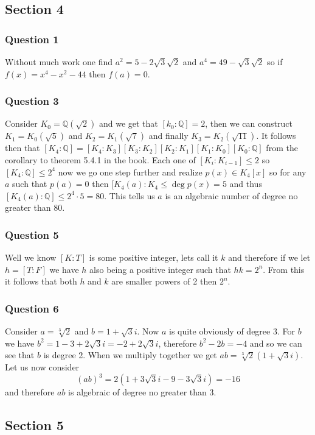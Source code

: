 \documentclass{article}
\begin{document}
\subsection{Section 4}
\subsubsection{Question 1}
Without much work one find $a^2 = 5-2\sqrt3\sqrt2$ and $a^4=49-\sqrt3\sqrt2$ so if $f(x) = x^4-x^2-44$ then $f(a) = 0$.

\subsubsection{Question 3}
Consider $K_0 = \mathbb Q(\sqrt 2)$ and we get that $[k_0:\mathbb Q] = 2$, then we can construct $K_1 = K_0(\sqrt 5)$ and $K_2 = K_1(\sqrt 7)$ and finally $K_3=K_2(\sqrt{11})$. It follows then that $[K_4:\mathbb Q] = [K_4:K_3][K_3:K_2][K_2:K_1][K_1:K_0][K_0:\mathbb Q]$ from the corollary to theorem 5.4.1 in the book. Each one of $[K_i:K_{i-1}]\le 2$ so $[K_4:\mathbb Q] \le 2^4$ now we go one step further and realize $p(x) \in K_4[x]$ so for any $a$ such that $p(a) = 0$ then $[K_4(a):K_4 \le \deg p(x) = 5$ and thus $[K_4(a):\mathbb Q] \le 2^4\cdot5=80$. This tells us $a$ is an algebraic number of degree no greater than 80.

\subsubsection{Question 5}
Well we know $[K:T]$ is some positive integer, lets call it $k$ and therefore if we let $h = [T:F]$ we have $h$ also being a positive integer such that $hk = 2^n$. From this it follows that both $h$ and $k$ are smaller powers of 2 then $2^n$.

\subsubsection{Question 6}

Consider $a = \sqrt[3]{2}$ and $b = 1+\sqrt3i$. Now $a$ is quite obviously of degree 3. For $b$ we have $b^2 = 1-3+2\sqrt3i  = -2+2\sqrt3i$, therefore $b^2-2b=-4$ and so we can see that $b$ is degree 2. When we multiply together we get $ab=\sqrt[3]2\left(1+\sqrt3i\right)$. Let us now consider $$(ab)^3 = 2\left(1+3\sqrt3i-9-3\sqrt3i\right) = -16$$ and therefore $ab$ is algebraic of degree no greater than 3.

\subsection{Section 5}
\end{document}

